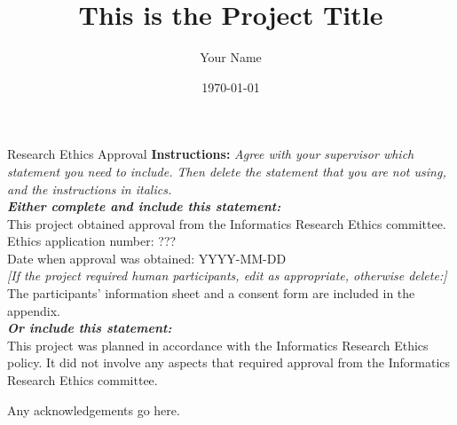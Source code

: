 \documentclass[logo,msc,draft]{infthesis}     %
\begin{document}
\begin{preliminary}

\title{This is the Project Title}

\author{Your Name}

\date{\today}


\maketitle

\newenvironment{ethics}
   {\begin{frontenv}{Research Ethics Approval}{\LARGE}}
   {\end{frontenv}\newpage}

\begin{ethics}
\textbf{Instructions:} \emph{Agree with your supervisor which
statement you need to include. Then delete the statement that you are not using,
and the instructions in italics.\\
\textbf{Either complete and include this statement:}}\\ %
%
This project obtained approval from the Informatics Research Ethics committee.\\
Ethics application number: ???\\
Date when approval was obtained: YYYY-MM-DD\\
%
\emph{[If the project required human participants, edit as appropriate, otherwise delete:]}\\ %
The participants' information sheet and a consent form are included in the appendix.\\
%
\textbf{\emph{Or include this statement:}}\\ %
This project was planned in accordance with the Informatics Research
Ethics policy. It did not involve any aspects that required approval
from the Informatics Research Ethics committee.

\standarddeclaration
\end{ethics}


\begin{acknowledgements}
Any acknowledgements go here.
\end{acknowledgements}


\tableofcontents
\end{preliminary}
\end{document}
